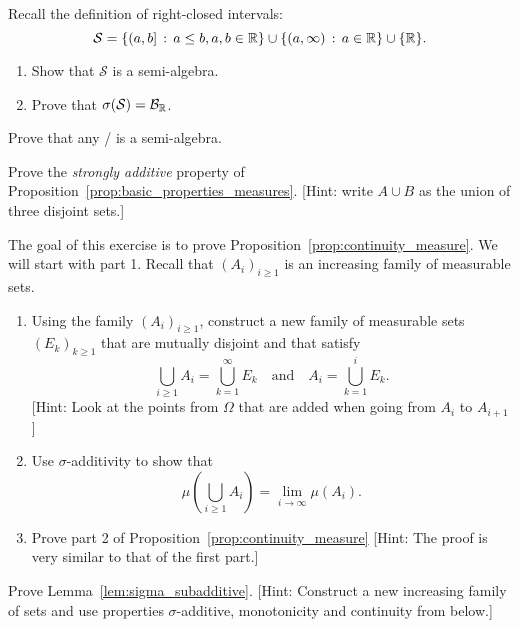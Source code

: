 \begin{problem}\label{prb:right_closed_intervals}
Recall the definition of right-closed intervals:
\[
	\mathcal{S} = \{(a,b] \, : \, a\le b, a, b \in \mathbb R\} \cup \{(a,\infty) \, : \, a \in \mathbb R\} \cup \{\mathbb R\}.
\]
\begin{enumerate}[label=(\alph*)]
\item Show that $\mathcal{S}$ is a semi-algebra.
\item Prove that $\sigma(\mathcal{S}) = \mathcal B_{\mathbb R}$.
\end{enumerate}

\end{problem}

\begin{problem}\label{prb:sigalg_is_semialg}
Prove that any \sigalg/ is a semi-algebra.
\end{problem}


\begin{problem}\label{prb:strongly_additive}
Prove the \emph{strongly additive} property of Proposition~\ref{prop:basic_properties_measures}. [Hint: write $A \cup B$ as the union of three disjoint sets.]
\end{problem}


\begin{problem}\label{prb:proof_continuity}
The goal of this exercise is to prove Proposition~\ref{prop:continuity_measure}. We will start with part 1. Recall that $(A_i)_{i \ge 1}$ is an increasing family of measurable sets.


\begin{enumerate}[label=(\alph*)]
\item Using the family $(A_i)_{i \ge 1}$, construct a new family of measurable sets $(E_k)_{k \ge 1}$ that are mutually disjoint and that satisfy
\[
	\bigcup_{i \ge 1} A_i = \bigcup_{k = 1}^\infty E_k \quad \text{and} \quad A_i = \bigcup_{k = 1}^i E_k.
\] 
[Hint: Look at the points from $\Omega$ that are added when going from $A_i$ to $A_{i + 1}$]

\item Use $\sigma$-additivity to show that
\[
	\mu(\bigcup_{i \ge 1} A_i) = \lim_{i \to \infty} \mu(A_i).
\]
\item Prove part 2 of Proposition~\ref{prop:continuity_measure} [Hint: The proof is very similar to that of the first part.]
\end{enumerate}

\end{problem}


\begin{problem}\label{prb:sigma_subadditive}
Prove Lemma~\ref{lem:sigma_subadditive}. [Hint: Construct a new increasing family of sets and use properties $\sigma$-additive, monotonicity and continuity from below.] 
\end{problem}


